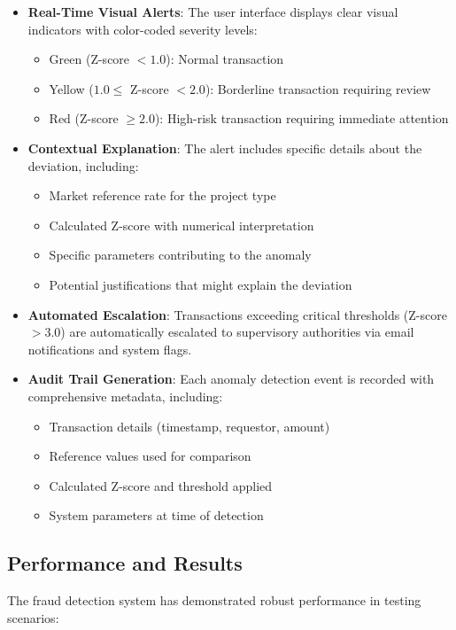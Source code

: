 \documentclass[12pt,a4paper]{report}
\begin{document}
\begin{itemize}
    \item \textbf{Real-Time Visual Alerts}: The user interface displays clear visual indicators with color-coded severity levels:
    \begin{itemize}
        \item Green (Z-score $< 1.0$): Normal transaction
        \item Yellow ($1.0 \leq$ Z-score $< 2.0$): Borderline transaction requiring review
        \item Red (Z-score $\geq 2.0$): High-risk transaction requiring immediate attention
    \end{itemize}
    
    \item \textbf{Contextual Explanation}: The alert includes specific details about the deviation, including:
    \begin{itemize}
        \item Market reference rate for the project type
        \item Calculated Z-score with numerical interpretation
        \item Specific parameters contributing to the anomaly
        \item Potential justifications that might explain the deviation
    \end{itemize}
    
    \item \textbf{Automated Escalation}: Transactions exceeding critical thresholds (Z-score $> 3.0$) are automatically escalated to supervisory authorities via email notifications and system flags.
    
    \item \textbf{Audit Trail Generation}: Each anomaly detection event is recorded with comprehensive metadata, including:
    \begin{itemize}
        \item Transaction details (timestamp, requestor, amount)
        \item Reference values used for comparison
        \item Calculated Z-score and threshold applied
        \item System parameters at time of detection
    \end{itemize}
\end{itemize}

\subsection{Performance and Results}
\indent \indent The fraud detection system has demonstrated robust performance in testing scenarios:
\end{document}
